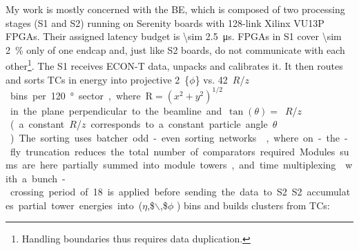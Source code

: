 \documentclass[11pt]{article}
\newcommand{\azimuth}{$\phi$}
\newcommand{\rapidity}{$\eta$}
\newcommand{\rz}{$R$/$z$}
\begin{document}
My work is mostly concerned with the \ac{BE}, which is composed of two processing stages (\ac{S1} and \ac{S2}) running on Serenity boards \cite{serenity} with 128-link Xilinx VU13P FPGAs.
Their assigned latency budget is \SI{\sim 2.5}{\micro\second}.
\acp{FPGA} in \ac{S1} cover \SI{\sim 2}{\percent} only of one endcap and, just like \ac{S2} boards, do not communicate with each other\footnote{Handling boundaries thus requires data duplication.}.
The \ac{S1} receives \ac{ECON-T} data, unpacks and calibrates it.
It then routes and sorts \acp{TC} in energy into projective \SI{2}\{\azimuth{}\} vs. \SI{42}{\rz} bins per \SI{120}{\degree} sector, where \(\text{R}=(x^{2}+y^{2})^{1/2}\) in the plane perpendicular to the beamline and \(\tan(\theta)=\) \si{\rz} (a constant \si{\rz} corresponds to a constant particle angle \(\theta\)).
The sorting uses batcher odd-even sorting networks \cite{sort_net2,calorPortales,sort_net}, where on-the-fly truncation reduces the total number of comparators required.
Modules sums are here partially summed into module towers, and time multiplexing \cite{zabi} with a bunch-crossing period of 18 is applied before sending the data to \ac{S2}.
\ac{S2} accumulates partial tower energies into (\rapidity{},\$$\backslash$,\$\azimuth{} ) bins and builds clusters from \acp{TC}:
\end{document}
